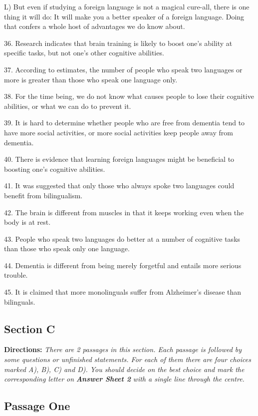 \documentclass[UTF8,11pt]{ctexart}
\begin{document}
L) But even if studying a foreign language is not a magical cure-all, there is one thing it will do: It will make you a better speaker of a foreign language. Doing that confers a whole host of advantages we do know about.


36. Research indicates that brain training is likely to boost one’s ability at specific tasks, but not one’s other cognitive abilities.


37. According to estimates, the number of people who speak two languages or more is greater than those who speak one language only.


38. For the time being, we do not know what causes people to lose their cognitive abilities, or what we can do to prevent it.


39. It is hard to determine whether people who are free from dementia tend to have more social activities, or more social activities keep people away from dementia.


40. There is evidence that learning foreign languages might be beneficial to boosting one’s cognitive abilities.


41. It was suggested that only those who always spoke two languages could benefit from bilingualism.


42. The brain is different from muscles in that it keeps working even when the body is at rest.


43. People who speak two languages do better at a number of cognitive tasks than those who speak only one language.


44. Dementia is different from being merely forgetful and entails more serious trouble.


45. It is claimed that more monolinguals suffer from Alzheimer’s disease than bilinguals.


\subsection*{\textbf{Section C}}


\textbf{Directions: }\textit{There are 2 passages in this section. Each passage is followed by some questions or unfinished} \textit{statements. For each of them there are four choices marked A), B), C) and D). You should decide on the best} \textit{choice and mark the corresponding letter on }\textbf{\textit{Answer Sheet 2}}\textit{ with a single line through the centre.}


\subsection*{\textbf{Passage One}}
\end{document}
